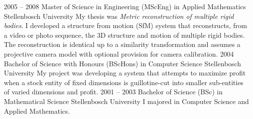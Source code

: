 \documentclass[9pt]{developercv} %
\begin{document}
\begin{entrylist}
	\entry
		{2005 -- 2008}
		{Master of Science in Engineering (MScEng) in Applied Mathematics}
		{Stellenbosch University}
		{My thesis was \textit{Metric reconstruction of multiple rigid bodies}. I developed a structure from motion (SfM) system that reconstructs, from a video or photo sequence, the 3D structure and motion of multiple rigid bodies. The reconstruction is identical up to a similarity transformation and assumes a projective camera model with optional provision for camera calibration.}
	\entry
		{2004}
		{Bachelor of Science with Honours (BScHons) in Computer Science}
		{Stellenbosch University}
		{My project was developing a system that attempts to maximize profit when a stock entity of fixed dimensions is guillotine-cut into smaller sub-entities of varied dimensions and profit.}
	\entry
		{2001 -- 2003}
		{Bachelor of Science (BSc) in Mathematical Science}
		{Stellenbosch University}
		{I majored in Computer Science and Applied Mathematics.}
\end{entrylist}

\end{document}
